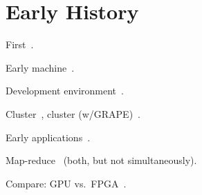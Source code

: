 \section{Early History}
\label{sec:history}

First~\cite{khdo06}.

Early machine~\cite{kdh+06}.

Development environment~\cite{cft+10}.

Cluster~\cite{tl10}, cluster (w/GRAPE)~\cite{sbm+09}.

Early applications~\cite{bkdb10,khdo06,shsc08,tl10}.

Map-reduce~\cite{ytt+08} (both, but not simultaneously).

Compare: GPU vs.~FPGA~\cite{bnw+10,cls+08,cmhm10,cz09,jpbc10,sww+10,tb10}.
